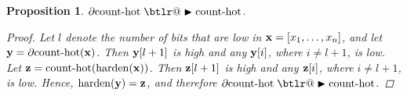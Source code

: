 \documentclass{article} %
\makeatletter
\newtheorem{prop}{Proposition}
\DeclareRobustCommand{\btright}{\mathrel{\mathpalette\btlr@\blacktriangleright}}
\newcommand{\btlr@}[2]{%
	\begingroup
	\sbox\z@{$\m@th#1\triangleright$}%
	\sbox\tw@{\resizebox{1.1\wd\z@}{1.1\ht\z@}{\raisebox{\depth}{$\m@th#1\mkern-1mu#2$}}}%
	\ht\tw@=\ht\z@ \dp\tw@=\dp\z@ \wd\tw@=\wd\z@
	\copy\tw@
	\endgroup
}
\makeatother
\begin{document}
\begin{prop}\label{prop:count}
	$\partial\!\operatorname{count-hot} \btright \operatorname{count-hot}$.
	\begin{proof}
	Let $l$ denote the number of bits that are low in ${\bf x} = [x_{1},\dots,x_{n}]$, and let ${\bf y} = \partial\!\operatorname{count-hot}({\bf x})$. Then ${\bf y}[l+1]$ is high and any ${\bf y}[i]$, where $i \neq l+1$, is low. Let ${\bf z} = \operatorname{count-hot}(\operatorname{harden}({\bf x}))$. Then ${\bf z}[l+1]$ is high and any ${\bf z}[i]$, where $i \neq l+1$, is low. Hence, $\operatorname{harden}({\bf y}) = {\bf z}$, and therefore $\partial\!\operatorname{count-hot} \btright \operatorname{count-hot}$.
	\end{proof}
\end{prop}
\end{document}
